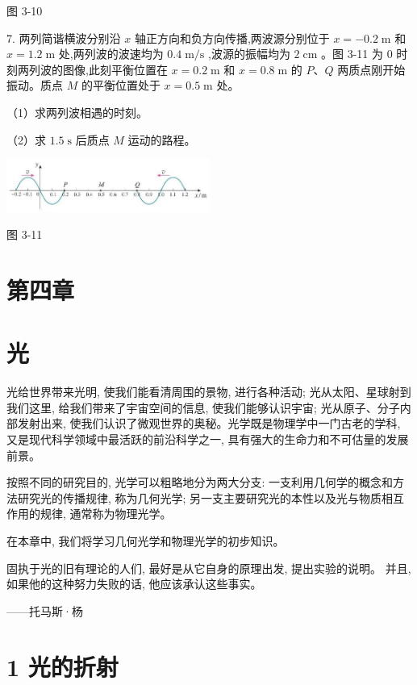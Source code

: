\documentclass[10pt]{article}
\begin{document}
图 3-10

7. 两列简谐横波分别沿 \(x\) 轴正方向和负方向传播,两波源分别位于 \(x = - {0.2}\mathrm{\;m}\) 和 \(x = {1.2}\mathrm{\;m}\) 处,两列波的波速均为 \({0.4}\mathrm{\;m}/\mathrm{s}\) ,波源的振幅均为 \(2\mathrm{\;{cm}}\) 。图 3-11 为 0 时刻两列波的图像,此刻平衡位置在 \(x = {0.2}\mathrm{\;m}\) 和 \(x = {0.8}\mathrm{\;m}\) 的 \(P\text{、}Q\) 两质点刚开始振动。质点 \(M\) 的平衡位置处于 \(x = {0.5}\mathrm{\;m}\) 处。

（1）求两列波相遇的时刻。

（2）求 \({1.5}\mathrm{\;s}\) 后质点 \(M\) 运动的路程。

\begin{center}
\includegraphics[max width=0.5\textwidth]{images/01910e4c-ebb8-7d2c-8f2f-2375bc1d2d12_88_604741.jpg}
\end{center}

图 3-11

\section*{第四章}

\section*{光}

光给世界带来光明, 使我们能看清周围的景物, 进行各种活动; 光从太阳、星球射到我们这里, 给我们带来了宇宙空间的信息, 使我们能够认识宇宙; 光从原子、分子内部发射出来, 使我们认识了微观世界的奥秘。光学既是物理学中一门古老的学科, 又是现代科学领域中最活跃的前沿科学之一, 具有强大的生命力和不可估量的发展前景。

按照不同的研究目的, 光学可以粗略地分为两大分支: 一支利用几何学的概念和方法研究光的传播规律, 称为几何光学; 另一支主要研究光的本性以及光与物质相互作用的规律, 通常称为物理光学。

在本章中, 我们将学习几何光学和物理光学的初步知识。

固执于光的旧有理论的人们, 最好是从它自身的原理出发, 提出实验的说明。 并且, 如果他的这种努力失败的话, 他应该承认这些事实。

——托马斯·杨

\section*{1 光的折射}
\end{document}
